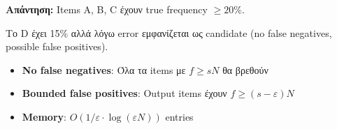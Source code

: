 \textbf{Απάντηση:} Items A, B, C έχουν true frequency $\geq 20\%$.

Το D έχει 15\% αλλά λόγω error εμφανίζεται ως candidate (no false negatives, possible false positives).

\begin{warningbox}
\begin{itemize}
    \item \textbf{No false negatives}: Όλα τα items με $f \geq sN$ θα βρεθούν
    \item \textbf{Bounded false positives}: Output items έχουν $f \geq (s-\varepsilon)N$
    \item \textbf{Memory}: $O(1/\varepsilon \cdot \log(\varepsilon N))$ entries
\end{itemize}
\end{warningbox}
